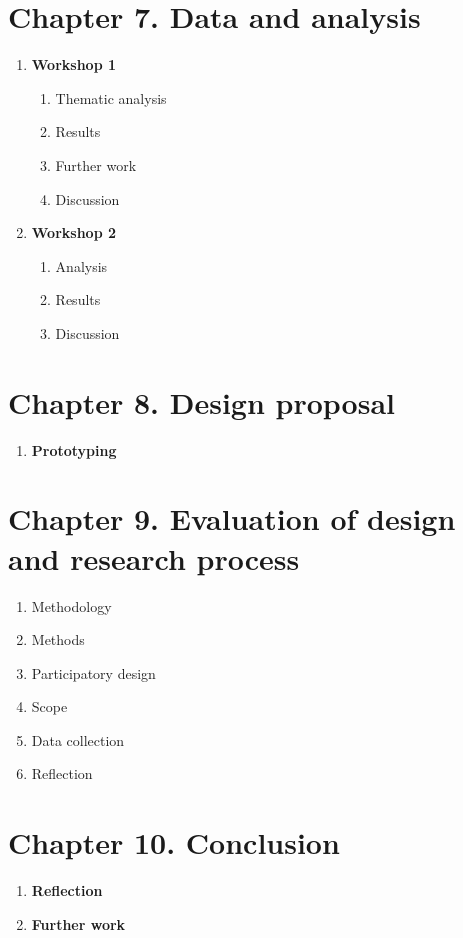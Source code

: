 \documentclass[11pt,UKenglish, a4paper]{article}
\begin{document}
\section{Chapter 7. Data and analysis}
\begin{enumerate}[label=\bfseries\arabic*]
\item \textbf{Workshop 1}
	\begin{enumerate}[label=\bfseries\arabic*]
	\item Thematic analysis
	\item Results
	\item Further work
	\item Discussion
	\end{enumerate}
	\item \textbf{Workshop 2}
	\begin{enumerate}[label=\bfseries\arabic*]
	\item Analysis
	\item Results
	\item Discussion
	\end{enumerate}
\end{enumerate}

\section{Chapter 8. Design proposal}
\begin{enumerate}
\item \textbf{Prototyping}
\end{enumerate}

\section{Chapter 9. Evaluation of design and research process}
\begin{enumerate}
\item Methodology
\item Methods
\item Participatory design
\item Scope
\item Data collection
\item Reflection
\end{enumerate}

\section{Chapter 10. Conclusion}
\begin{enumerate}
\item \textbf{Reflection}
\item \textbf{Further work}
\end{enumerate}
\end{document}
